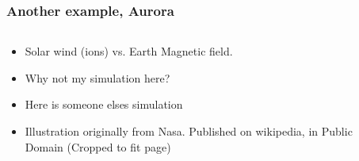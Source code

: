 \documentclass{beamer}
\begin{document}
\begin{frame}
\frametitle{Another example, Aurora}
\begin{columns}
\begin{column}{0.5\linewidth}
\begin{itemize}
\item<1-> Solar wind (ions) vs. Earth Magnetic field.


\item<2-> Why not my simulation here?

\item<3-> Here is someone elses simulation

\item<1-3> {\color{gray} Illustration originally from Nasa. Published on wikipedia, in Public Domain (Cropped to fit page) }
\end{itemize}
\end{column}
\begin{column}{0.5\linewidth}


\end{column}
\end{columns}
\end{frame}
\end{document}
